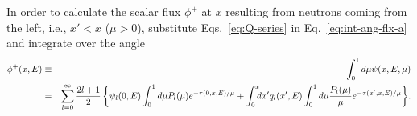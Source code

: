 
%
In order to calculate the scalar flux $\phi^+$ at $x$ resulting from neutrons coming from the left, i.e., $x'<x$ ($\mu>0$), substitute Eqs.~\eqref{eq:Q-series} in Eq.~\eqref{eq:int-ang-flx-a} and integrate over the angle 
\begin{eqnarray}\label{eq:phi+}
\phi^+(x,E)&\equiv& \int_0^1 {d\mu \psi(x,E,\mu)} \nonumber \\
&=& \sum\limits_{l=0}^\infty {
	\frac{2l+1}{2} 
		\left\{\psi_l(0,E) \int_0^1 { d\mu
		\ensuremath{P_l(\mu)} e^{-\tau(0,x,E)/\mu}	
	}
	+	\int_0^x {\!\!\! dx'
		q_l(x',E)
		\int_0^1 { d\mu
			\frac{\ensuremath{P_l(\mu)}}{\mu} e^{-\tau(x',x,E)/\mu}	
		}
	}
\right\}
} .
\end{eqnarray}

